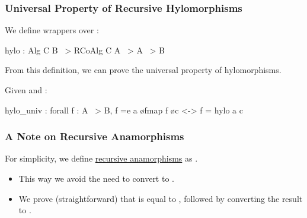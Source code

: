 \begin{frame}[fragile]
  \frametitle{Universal Property of Recursive Hylomorphisms}

  We define wrappers over :
  \vspace{.2cm}

  \begin{center}
  \begin{minipage}{.6\textwidth}
  \begin{bluebox}
  \begin{coqcode}
hylo : Alg C B ~> RCoAlg C A ~> A ~> B
  \end{coqcode}
  \end{bluebox}
  \end{minipage}
  \end{center}

  \vspace{.6cm}
  From this definition, we can prove the universal property of hylomorphisms.

  Given  and :
  \vspace{.2cm}

  \begin{center}
  \begin{minipage}{.6\textwidth}
  \begin{bluebox}
  \begin{coqcode}
hylo_univ : forall f : A ~> B,
  f =e a \o fmap f \o c <-> f = hylo a c
  \end{coqcode}
  \end{bluebox}
  \end{minipage}
  \end{center}

\end{frame}

\begin{frame}[fragile]
  \frametitle{A Note on Recursive Anamorphisms}

  For simplicity, we define \ul{recursive anamorphisms} as
  .
  \begin{itemize}
  \item This way we avoid the need to convert  to .
  \item We prove (straightforward) that  is equal to ,
followed by converting the result to .
  \end{itemize}

\end{frame}

